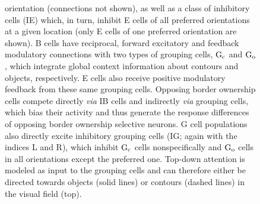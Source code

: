 \begin{figure}[t]
{  orientation (connections not shown),
  as well as a class of inhibitory cells (IE) which, in turn, inhibit
  E cells of all preferred orientations at a given location
  (only E cells of one preferred orientation are shown).
  B cells have reciprocal, forward excitatory and feedback modulatory
  connections with two types of grouping cells, $\rm G_c$ and $\rm G_o$, which integrate global context information about contours and objects,
  respectively. E cells also receive positive modulatory feedback
  from these same grouping cells. Opposing border ownership cells compete
  directly {\em via} IB cells and indirectly {\em via} grouping cells,
  which bias their activity and thus generate the response differences of
  opposing border ownership selective neurons. 
  G cell populations also directly excite
  inhibitory grouping cells (IG; again with the indices L and R),
  which inhibit $\rm G_c$ cells nonspecifically and $\rm G_o$ cells in
  all orientations except the preferred one. Top-down attention is
  modeled as input to the grouping cells and can therefore either be directed towards objects (solid lines) or contours (dashed lines) in the visual field (top).}
\label{Fig:anatomy}
\end{figure}


